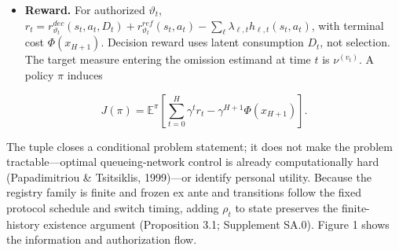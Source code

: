 \documentclass[
  11pt]{article}
\begin{document}
\begin{itemize}
  not a registry rollback. An allowlist alone does not make reset
  exogenous: confirmatory use must also freeze its trigger/timing and
  deterministic target-selection rule before outcomes; otherwise it is
  an exploratory new experiment. Proposition 3.1 is per instance, not
  global across resets. An \textbf{evaluation cohort} is a maximal
  interval of constant \(v_t\); its \(\nu^{(v_t)}\) is frozen for each
  version before outcome unlock and merely looked up at evaluation, with
  no outcome-dependent selection or cross-cohort pooling. Objective
  rollback restores an objective version only, never a registry version.
\item
  \textbf{Reward.} For authorized \(\vartheta_t\),
  \(r_t=r^{dec}_{\vartheta_t}(s_t,a_t,D_t)+r^{ref}_{\vartheta_t}(s_t,a_t)-\sum_\ell\lambda_{\ell,t}h_{\ell,t}(s_t,a_t)\),
  with terminal cost \(\Phi(x_{H+1})\). Decision reward uses latent
  consumption \(D_t\), not selection. The target measure entering the
  omission estimand at time \(t\) is \(\nu^{(v_t)}\). A policy \(\pi\)
  induces
\end{itemize}

\[J(\pi)=\mathbb E^\pi\!\left[\sum_{t=0}^{H}\gamma^t r_t-\gamma^{H+1}\Phi(x_{H+1})\right].\tag{2}\]

The tuple closes a conditional problem statement; it does not make the
problem tractable---optimal queueing-network control is already
computationally hard (Papadimitriou \& Tsitsiklis, 1999)---or identify
personal utility. Because the registry family is finite and frozen ex
ante and transitions follow the fixed protocol schedule and switch
timing, adding \(\rho_t\) to state preserves the finite-history
existence argument (Proposition 3.1; Supplement SA.0). Figure 1 shows
the information and authorization flow.
\end{document}
